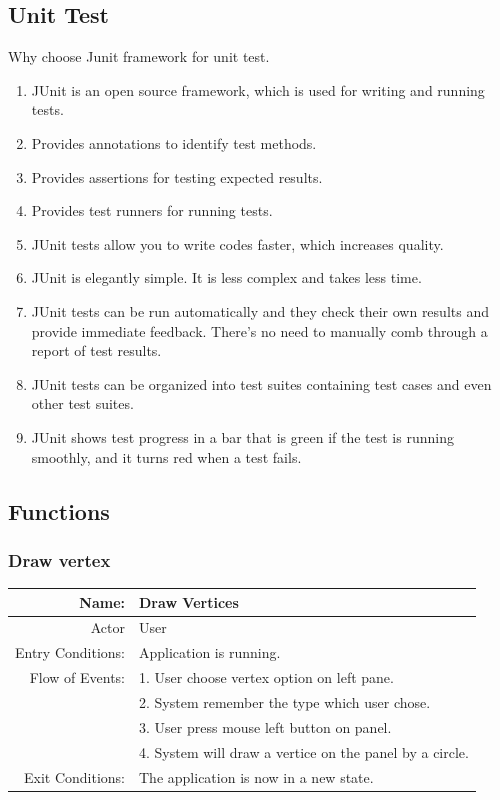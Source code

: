 \documentclass[a4paper,10pt]{article}
\begin{document}
\subsection{Unit Test} 
Why choose Junit framework for unit test.
\begin{enumerate}
	\item JUnit is an open source framework, which is used for writing and running tests.
	\item Provides annotations to identify test methods.
	\item Provides assertions for testing expected results.
	\item Provides test runners for running tests.
	\item JUnit tests allow you to write codes faster, which increases quality.
	\item JUnit is elegantly simple. It is less complex and takes less time.
	\item JUnit tests can be run automatically and they check their own results and provide immediate feedback. There's no need to manually comb through a report of test results.
	\item JUnit tests can be organized into test suites containing test cases and even other test suites.
	\item JUnit shows test progress in a bar that is green if the test is running smoothly, and it turns red when a test fails.
	
\end{enumerate}

\subsection{Functions} 
\subsubsection{Draw vertex}
	\begin{tabular}{|r|l|}
\hline
Name: & Draw Vertices \\
\hline
Actor & User \\
\hline
Entry Conditions: & Application is running. \\
\hline
Flow of Events: & 1. User choose vertex option on left pane. \\


& 2. System remember the type which user chose.  \\
& 3. User press mouse left button on panel.  \\
& 4. System will draw a vertice on the panel by a circle.  \\
\hline
Exit Conditions: & The application is now in a new state. \\
\hline

\end{tabular}
\end{document}
